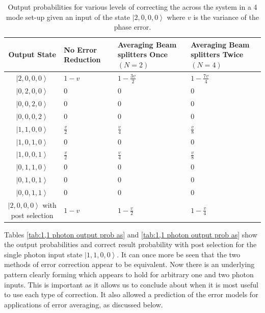 \documentclass[aps,pra,twocolumn,superscriptaddress,numerical]{revtex4-1}
\begin{document}
\begin{widetext}
\begin{table}
{		\begin{centering}
			\begin{tabular}{|c|>{\centering}p{4cm}|>{\centering}p{4cm}|>{\centering}p{4cm}|}
				\hline 
				Output State & No Error Reduction & Averaging Beam splitters Once $\left(N=2\right)$ & Averaging Beam splitters Twice $\left(N=4\right)$\tabularnewline
				\hline 
				\hline 
				$\left|2,0,0,0\right\rangle $ & $1-v$ & $1-\frac{3v}{2}$ & $1-\frac{7v}{4}$\tabularnewline
				\hline 
				$\left|0,2,0,0\right\rangle $ & $0$ & $0$ & $0$\tabularnewline
				\hline 
				$\left|0,0,2,0\right\rangle $ & $0$ & $0$ & $0$\tabularnewline
				\hline 
				$\left|0,0,0,2\right\rangle $ & $0$ & $0$ & $0$\tabularnewline
				\hline 
				$\left|1,1,0,0\right\rangle $ & $\frac{v}{2}$ & $\frac{v}{4}$ & $\frac{v}{8}$\tabularnewline
				\hline 
				$\left|1,0,1,0\right\rangle $ & $0$ & $0$ & $0$\tabularnewline
				\hline 
				$\left|1,0,0,1\right\rangle $ & $\frac{v}{2}$ & $\frac{v}{4}$ & $\frac{v}{8}$\tabularnewline
				\hline 
				$\left|0,1,1,0\right\rangle $ & $0$ & $0$ & $0$\tabularnewline
				\hline 
				$\left|0,1,0,1\right\rangle $ & $0$ & $0$ & $0$\tabularnewline
				\hline 
				$\left|0,0,1,1\right\rangle $ & $0$ & $0$ & $0$\tabularnewline
				\hline 
				$\left|2,0,0,0\right\rangle $ with post selection & $1-v$ & $1-\frac{v}{2}$ & $1-\frac{v}{4}$\tabularnewline
				\hline 
			\end{tabular}
			\par\end{centering}
		
	}
	
	\caption[Output probabilities for various levels of correcting the across the
	system in a 4 mode set-up given an input of the state $\left|2,0,0,0\right\rangle $.]{Output probabilities for various levels of correcting the across
		the system in a 4 mode set-up given an input of the state $\left|2,0,0,0\right\rangle $
		where $v$ is the variance of the phase error. \label{tab:2 photon output prob as}}
\end{table}


Tables \ref{tab:1,1 photon output prob as} and \ref{tab:1,1 photon output prob as}
show the output probabilities and correct result probability with
post selection for the single photon input state $\left|1,1,0,0\right\rangle $.
It can once more be seen that the two methods of error correction
appear to be equivalent. Now there is an underlying pattern clearly
forming which appears to hold for arbitrary one and two photon inputs.
This is important as it allows us to conclude about when it is most
useful to use each type of correction. It also allowed a prediction
of the error models for applications of error averaging, as discussed
below.


\end{widetext}
\end{document}
